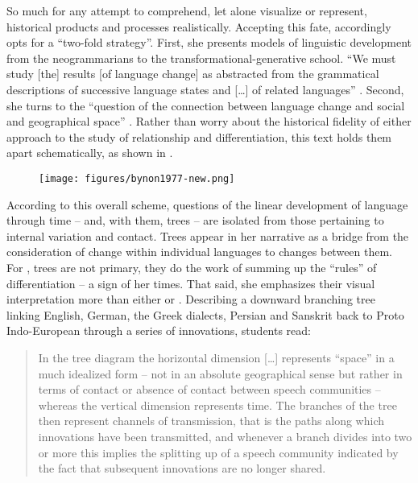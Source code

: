 \documentclass[output=paper]{langscibook}
\begin{document}
So much for any attempt to comprehend, let alone visualize or represent, historical products and processes realistically. Accepting this fate, {\Bynon} accordingly opts for a ``two-fold strategy''. First, she presents models of linguistic development from the neogrammarians to the transformational-generative school. ``We must study [the] results [of language change] as abstracted from the grammatical descriptions of successive language states and […] of related languages'' \citep[6]{Bynon1977}. Second, she turns to the ``question of the connection between language change and social and geographical space'' \citep[6]{Bynon1977}. Rather than worry about the historical fidelity of either approach to the study of relationship and differentiation, this text holds them apart schematically, as shown in .

\begin{figure}
    \centering
    \texttt{[image: figures/bynon1977-new.png]}
    \caption{\citet[173]{Bynon1977}}
    \label{fig:kaplan:bynon1977}
\end{figure}

According to this overall scheme, questions of the linear development of language through time -- and, with them, trees -- are isolated from those pertaining to internal variation and contact. Trees appear in her narrative as a bridge from the consideration of change within individual languages to changes between them. For {\Bynon}, trees are not primary, they do the work of summing up the ``rules'' of differentiation -- a sign of her times. That said, she emphasizes their visual interpretation more than either {\Bloomfield} or {\Hockett}. Describing a downward branching tree linking English, German, the Greek dialects, Persian and Sanskrit back to Proto Indo-European through a series of innovations, students read:

\begin{quotation}
In the tree diagram the horizontal dimension […] represents ``space'' in a much idealized form -- not in an absolute geographical sense but rather in terms of contact or absence of contact between speech communities -- whereas the vertical dimension represents time. The branches of the tree then represent channels of transmission, that is the paths along which innovations have been transmitted, and whenever a branch divides into two or more this implies the splitting up of a speech community indicated by the fact that subsequent innovations are no longer shared. \citep[66]{Bynon1977}
\end{quotation}
\end{document}
